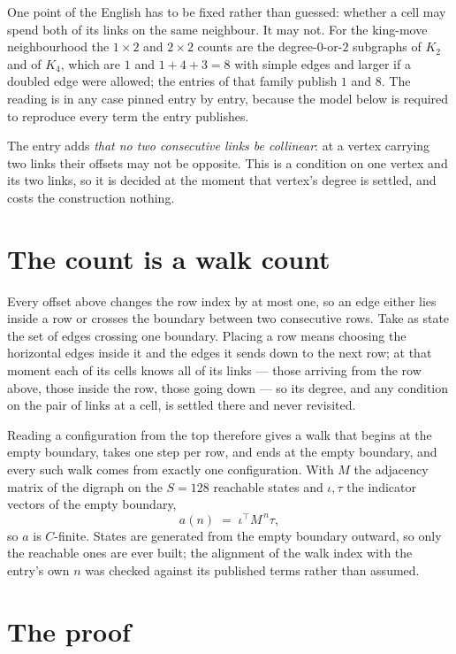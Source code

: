 \documentclass[11pt,a4paper]{article}
\theoremstyle{plain}
\theoremstyle{definition}
\begin{document}
One point of the English has to be fixed rather than guessed: whether a cell may spend both of
its links on the same neighbour. It may not. For the king-move neighbourhood the $1\times2$
and $2\times2$ counts are the degree-$0$-or-$2$ subgraphs of $K_2$ and of $K_4$, which are $1$
and $1+4+3=8$ with simple edges and larger if a doubled edge were allowed; the entries of that
family publish $1$ and $8$. The reading is in any case pinned entry by entry, because the
model below is required to reproduce every term the entry publishes.

The entry adds \emph{that no two consecutive links be collinear}: at a vertex carrying two
links their offsets may not be opposite. This is a condition on one vertex and its two links,
so it is decided at the moment that vertex's degree is settled, and costs the construction
nothing.

\section{The count is a walk count}

Every offset above changes the row index by at most one, so an edge either lies inside a row
or crosses the boundary between two consecutive rows. Take as state the set of edges crossing
one boundary. Placing a row means choosing the horizontal edges inside it and the edges it
sends down to the next row; at that moment each of its cells knows all of its links --- those
arriving from the row above, those inside the row, those going down --- so its degree, and any
condition on the pair of links at a cell, is settled there and never revisited.

Reading a configuration from the top therefore gives a walk that begins at the empty boundary,
takes one step per row, and ends at the empty boundary, and every such walk comes from exactly
one configuration. With $M$ the adjacency matrix of the digraph on the $S=128$ reachable
states and $\iota,\tau$ the indicator vectors of the empty boundary,
\[
a(n)\;=\;\iota^{\!\top}M^{\,n}\tau ,
\]
so $a$ is $C$-finite. States are generated from the empty boundary outward, so only the
reachable ones are ever built; the alignment of the walk index with the entry's own $n$ was
checked against its published terms rather than assumed.

\section{The proof}
\end{document}
